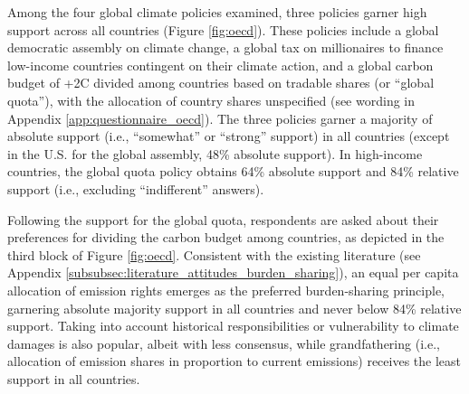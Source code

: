 \begin{bibunit}
Among the four global climate policies examined, three policies garner high support across all countries (Figure \ref{fig:oecd}). These policies include a global democratic assembly on climate change, a global tax on millionaires to finance low-income countries contingent on their climate action, and a global carbon budget of +2\textdegree{}C divided among countries based on tradable shares (or ``global quota''), with the allocation of country shares unspecified (see wording in Appendix \ref{app:questionnaire_oecd}). 
The three policies garner a majority of absolute support (i.e., ``somewhat'' or ``strong'' support) in all countries (except in the U.S. for the global assembly, 48\% absolute support). In high-income countries, the global quota policy obtains 64\% absolute support and 84\% relative support (i.e., excluding ``indifferent'' answers). %

Following the support for the global quota, respondents are asked about their preferences for dividing the carbon budget among countries, as depicted in the third block of Figure \ref{fig:oecd}. Consistent with the existing literature (see Appendix \ref{subsubsec:literature_attitudes_burden_sharing}), an equal per capita allocation of emission rights emerges as the preferred burden-sharing principle, garnering absolute majority support in all countries and never below 84\% relative support. Taking into account historical responsibilities or vulnerability to climate damages is also popular, albeit with less consensus, while grandfathering (i.e., allocation of emission shares in proportion to current emissions) receives the least support in all countries.


\end{bibunit}
